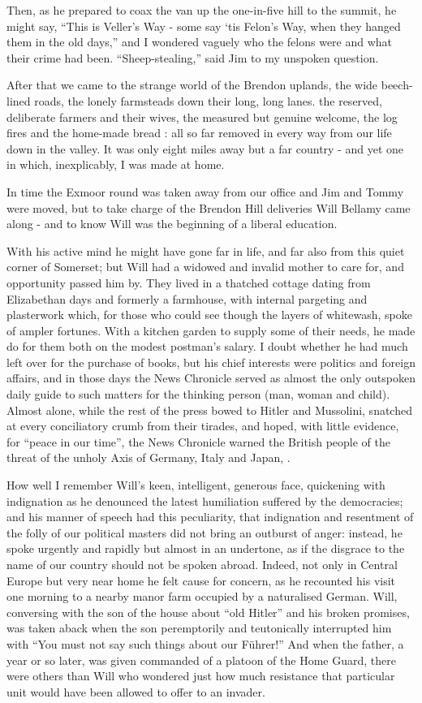 Then, as he prepared to coax the van up the one-in-five hill to the summit, he might say, “This is Veller’s Way - some say ‘tis Felon’s Way, when they hanged them in the old days,” and I wondered vaguely who the felons were and what their crime had been. “Sheep-stealing,” said Jim to my unspoken question.

After that we came to the strange world of the Brendon uplands, the wide beech-lined roads, the lonely farmsteads down their long, long lanes. the reserved, deliberate farmers and their wives, the measured but genuine welcome, the log fires and the home-made bread : all so far removed in every way from our life down in the valley. It was only eight miles away but a far country - and yet one in which, inexplicably, I was made at home. 

In time the Exmoor round was taken away from our office and Jim and Tommy were moved, but to take charge of the Brendon Hill deliveries Will Bellamy came along - and to know Will was the beginning of a liberal education.	

With his active mind he might have gone far in life, and far also from this quiet corner of Somerset; but Will had a widowed and invalid mother to care for, and opportunity passed him by. They lived in a thatched cottage dating from Elizabethan days and formerly a farmhouse, with internal pargeting and plasterwork which, for those who could see though the layers of whitewash, spoke of ampler fortunes. With a kitchen garden to supply some of their needs, he made do for them both on the modest postman’s salary. I doubt whether he had much left over for the purchase of books, but his chief interests were politics and foreign affairs, and in those days the News Chronicle served as almost the only outspoken daily guide to such matters for the thinking person (man, woman and child). Almost alone, while the rest of the press bowed to Hitler and Mussolini, snatched at every conciliatory crumb from their tirades, and hoped, with little evidence, for “peace in our time”, the News Chronicle warned the British people of the threat of the unholy Axis of Germany, Italy and Japan, .

How well I remember Will’s keen, intelligent, generous face, quickening with indignation as he denounced the latest humiliation suffered by the democracies; and his manner of speech had this peculiarity, that indignation and resentment of the folly of our political masters did not bring an outburst of anger: instead, he spoke urgently and rapidly but almost in an undertone, as if the disgrace to the name of our country should not be spoken abroad. Indeed, not only in Central Europe but very near home he felt cause for concern, as he recounted his visit one morning to a nearby manor farm occupied by a naturalised German. Will, conversing with the son of the house about “old Hitler” and his broken promises, was taken aback when the son peremptorily and teutonically interrupted him with “You must not say such things about our Führer!” And when the father, a year or so later, was given commanded of a platoon of the Home Guard, there were others than Will who wondered just how much resistance that particular unit would have been allowed to offer to an invader.

